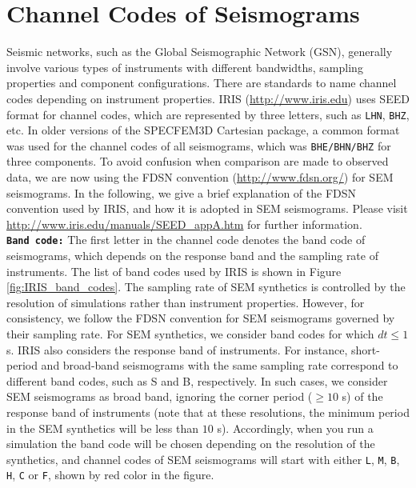 \chapter{Channel Codes of Seismograms}\label{cha:channel-codes}

Seismic networks, such as the Global Seismographic Network (GSN),
generally involve various types of instruments with different bandwidths,
sampling properties and component configurations. There are standards
to name channel codes depending on instrument properties. IRIS (\url{http://www.iris.edu})
uses SEED format for channel codes, which are represented by three
letters, such as \texttt{LHN}, \texttt{BHZ}, etc. In older versions
of the SPECFEM3D Cartesian package, a common format was used for the
channel codes of all seismograms, which was \texttt{BHE/BHN/BHZ} for
three components. To avoid confusion when comparison are made to observed
data, we are now using the FDSN convention (\url{http://www.fdsn.org/})
for SEM seismograms. In the following, we give a brief explanation
of the FDSN convention used by IRIS, and how it is adopted in SEM
seismograms. Please visit \url{http://www.iris.edu/manuals/SEED_appA.htm}
for further information.\\


\noindent \texttt{\textbf{Band code:}} The first letter in the channel
code denotes the band code of seismograms, which depends on the response
band and the sampling rate of instruments. The list of band codes
used by IRIS is shown in Figure \ref{fig:IRIS_band_codes}. The sampling
rate of SEM synthetics is controlled by the resolution of simulations
rather than instrument properties. However, for consistency, we follow
the FDSN convention for SEM seismograms governed by their sampling
rate. For SEM synthetics, we consider band codes for which $dt\leq1$
s. IRIS also considers the response band of instruments. For instance,
short-period and broad-band seismograms with the same sampling rate
correspond to different band codes, such as S and B, respectively.
In such cases, we consider SEM seismograms as broad band, ignoring
the corner period ($\geq10$ s) of the response band of instruments
(note that at these resolutions, the minimum period in the SEM synthetics
will be less than $10$ s). Accordingly, when you run a simulation
the band code will be chosen depending on the resolution of the synthetics,
and channel codes of SEM seismograms will start with either \texttt{L},
\texttt{M}, \texttt{B}, \texttt{H}, \texttt{C} or \texttt{F}, shown
by red color in the figure.\\


